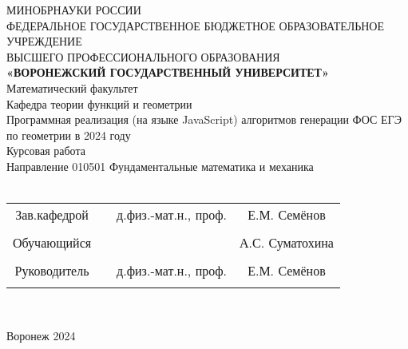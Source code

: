 
\begin{center}
	\hfill \break
	\large{МИНОБРНАУКИ РОССИИ}\\
	\footnotesize{ФЕДЕРАЛЬНОЕ ГОСУДАРСТВЕННОЕ БЮДЖЕТНОЕ ОБРАЗОВАТЕЛЬНОЕ УЧРЕЖДЕНИЕ}\\
	\footnotesize{ВЫСШЕГО ПРОФЕССИОНАЛЬНОГО ОБРАЗОВАНИЯ}\\
	\small{\textbf{«ВОРОНЕЖСКИЙ ГОСУДАРСТВЕННЫЙ УНИВЕРСИТЕТ»}}\\
	\hfill \break
	\normalsize{Математический факультет}\\
	\hfill \break
	\normalsize{Кафедра теории функций и геометрии}\\
	\hfill\break
	\hfill \break
	\hfill \break
	\hfill \break
	\large{Программная реализация (на языке JavaScript) алгоритмов генерации ФОС ЕГЭ по геометрии в 2024 году}\\
	\hfill \break
	\hfill \break
	\hfill \break
	\hfill \break
	\hfill \break
	\normalsize{Курсовая работа\\
		\hfill \break
		Направление  010501 Фундаментальные математика и механика\\

		\hfill \break
	}\\
	\hfill \break
	\hfill \break
\end{center}
\hfill \break

\normalsize{
	\begin{tabular}{cccc}
		Зав.кафедрой & \underline{\hspace{3cm}} & д.физ.-мат.н.,  проф. & Е.М. Семёнов    \\\\
		Обучающийся  & \underline{\hspace{3cm}} &                       & А.С. Суматохина \\\\
		Руководитель & \underline{\hspace{3cm}} & д.физ.-мат.н.,  проф. & Е.М. Семёнов    \\\\
	\end{tabular}
}\\
\hfill \break
\hfill \break
\begin{center} Воронеж 2024 \end{center}
\thispagestyle{empty} %

